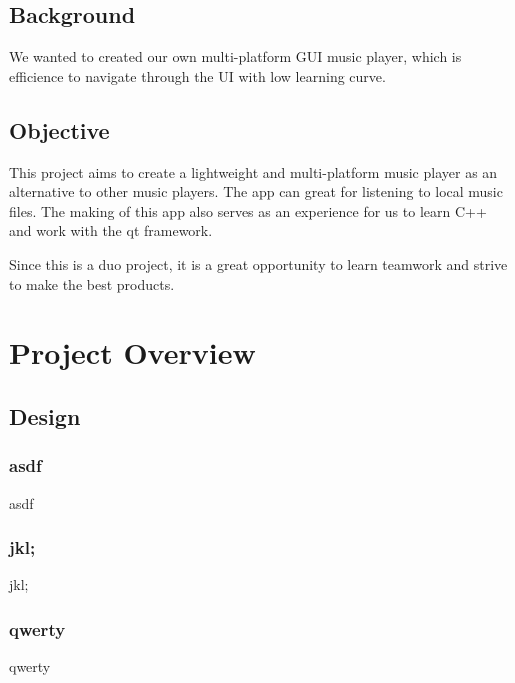 \documentclass[12pt]{report} %
\begin{document}
\section{Background}
\hspace{1cm}We wanted to created our own multi-platform GUI music player, which is efficience to navigate
through the UI with low learning curve.

\section{Objective}
\hspace{1cm}This project aims to create a lightweight and multi-platform music player as an alternative
to other music players. The app can great for listening to local music files. The making of this app
also serves as an experience for us to learn C++ and work with the qt framework.

Since this is a duo project, it is a great opportunity to learn teamwork and strive to make the best
products.
 
\chapter{Project Overview}
\section{Design}
\subsection{asdf}
\hspace{1cm}asdf
\subsection{jkl;}
\hspace{1cm}jkl;
\subsection{qwerty}
\hspace{1cm}qwerty
\end{document}
